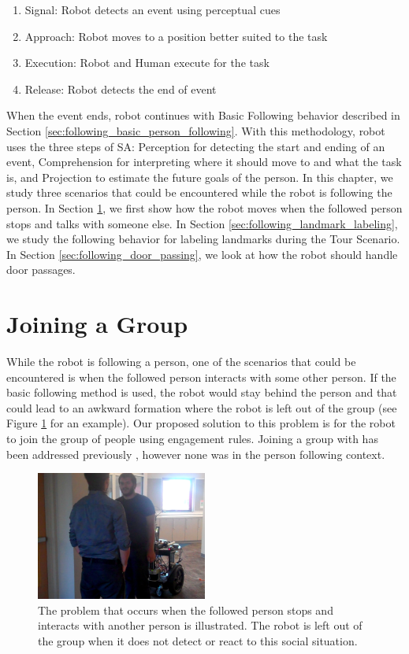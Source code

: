 \begin{enumerate}
\item Signal: Robot detects an event using perceptual cues
\item Approach: Robot moves to a position better suited to the task
\item Execution: Robot and Human execute for the task
\item Release: Robot detects the end of event
\end{enumerate}

When the event ends, robot continues with Basic Following behavior described in Section \ref{sec:following_basic_person_following}. With this methodology, robot uses the three steps of SA: Perception for detecting the start and ending of an event, Comprehension for interpreting where it should move to and what the task is, and Projection to estimate the future goals of the person. In this chapter, we study three scenarios that could be encountered while the robot is following the person. In Section \ref{sec:following_joining_group}, we first show how the robot moves when the followed person stops and talks with someone else. In Section \ref{sec:following_landmark_labeling}, we study the following behavior for labeling landmarks during the Tour Scenario. In Section \ref{sec:following_door_passing}, we look at how the robot should handle door passages.


\section{Joining a Group}
\label{sec:following_joining_group}

While the robot is following a person, one of the scenarios that could be encountered is when the followed person interacts with some other person. If the basic following method is used, the robot would stay behind the person and that could lead to an awkward formation where the robot is left out of the group (see Figure \ref{fig:group_problem} for an example). Our proposed solution to this problem is for the robot to join the group of people using engagement rules. Joining a group with has been addressed previously \cite{althaus2004navigation,setti2015f}, however none was in the person following context.

\begin{figure}[ht!]
\centering
\includegraphics[width=0.5\textwidth]{pics/group_problem}
\caption{The problem that occurs when the followed person stops and interacts with another person is illustrated. The robot is left out of the group when it does not detect or react to this social situation.}
\label{fig:group_problem}
\end{figure}



